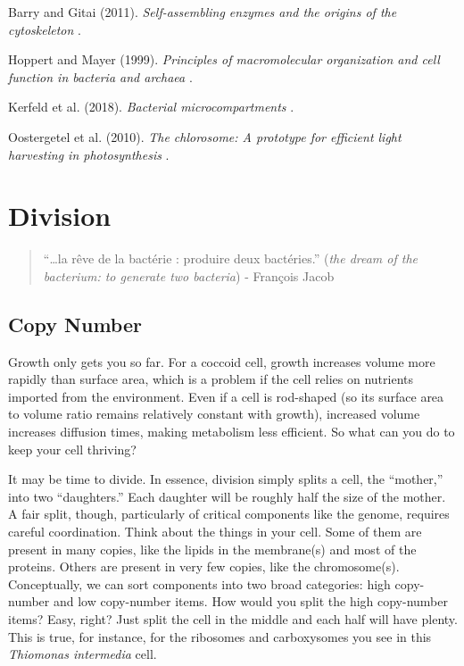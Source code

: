 \documentclass[]{tufte-book}
\begin{document}
Barry and Gitai (2011). \emph{Self-assembling enzymes and the origins of the cytoskeleton} \citep{barry2011}.

Hoppert and Mayer (1999). \emph{Principles of macromolecular organization and cell function in bacteria and archaea} \citep{hoppert1999}.

Kerfeld et al. (2018). \emph{Bacterial microcompartments} \citep{kerfeld2018}.

Oostergetel et al. (2010). \emph{The chlorosome: A prototype for efficient light harvesting in photosynthesis} \citep{oostergetel2010}.

\hypertarget{division}{%
\chapter{Division}\label{division}}

\begin{quote}
``\ldots{}la rêve de la bactérie : produire deux bactéries.'' (\emph{the dream of the bacterium: to generate two bacteria})
- François Jacob \citep{jacob2002a}
\end{quote}

\hypertarget{copy-number}{%
\section{Copy Number}\label{copy-number}}

Growth only gets you so far. For a coccoid cell, growth increases volume more rapidly than surface area, which is a problem if the cell relies on nutrients imported from the environment. Even if a cell is rod-shaped (so its surface area to volume ratio remains relatively constant with growth), increased volume increases diffusion times, making metabolism less efficient. So what can you do to keep your cell thriving?

It may be time to divide. In essence, division simply splits a cell, the ``mother,'' into two ``daughters.'' Each daughter will be roughly half the size of the mother. A fair split, though, particularly of critical components like the genome, requires careful coordination. Think about the things in your cell. Some of them are present in many copies, like the lipids in the membrane(s) and most of the proteins. Others are present in very few copies, like the chromosome(s). Conceptually, we can sort components into two broad categories: high copy-number and low copy-number items. How would you split the high copy-number items? Easy, right? Just split the cell in the middle and each half will have plenty. This is true, for instance, for the ribosomes and carboxysomes you see in this \emph{Thiomonas intermedia} cell.
\end{document}
